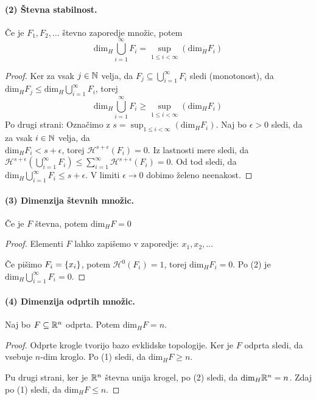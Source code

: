 \paragraph{(2) Števna stabilnost.} Če je \(F_1, F_2, \ldots\) števno zaporedje množic, potem 
\[\text{dim}_H \bigcup_{i=1}^\infty F_i = \sup_{1 \leq i < \infty} (\text{dim}_H F_i)\]
\begin{proof}
    Ker za vsak \(j \in \mathbb{N}\) velja, da \(F_j \subseteq \bigcup_{i=1}^\infty F_i\) sledi (monotonost), da \(\text{dim}_H F_j \leq \text{dim}_H \bigcup_{i=1}^\infty F_i\), torej 
    \[\text{dim}_H \bigcup_{i=1}^\infty F_i \geq \sup_{1 \leq i < \infty} (\text{dim}_H F_i)\]
    Po drugi strani: Označimo z \(s = \sup_{1 \leq i < \infty} (\text{dim}_H F_i)\). Naj bo \(\epsilon > 0\) sledi, da za vsak \(i \in \mathbb{N}\) velja, da \\ \(\text{dim}_H F_i < s + \epsilon\), torej \(\mathcal{H}^{s + \epsilon}(F_i) = 0\). Iz lastnosti mere sledi, da \(\mathcal{H}^{s + \epsilon} \left(\bigcup_{i=1}^\infty F_i\right) \leq \sum_{i=1}^{\infty} \mathcal{H}^{s + \epsilon}(F_i) = 0\). Od tod sledi, da \(\text{dim}_H \bigcup_{i=1}^\infty F_i \leq s + \epsilon\). V limiti \(\epsilon \to 0\) dobimo želeno neenakost. 
\end{proof}

\paragraph{(3) Dimenzija števnih množic.} Če je \(F\) števna, potem \(\text{dim}_H  F = 0\)
\begin{proof}
    Elementi \(F\) lahko zapišemo v zaporedje: \(x_1, x_2, \ldots\) 
    
    Če pišimo \(F_i = \left\{x_i\right\}\), potem \(\mathcal{H}^{0}(F_i) = 1\), torej \(\text{dim}_H F_i = 0\). Po (2) je \(\text{dim}_H \bigcup_{i=1}^\infty F_i = 0\).
\end{proof}

\paragraph{(4) Dimenzija odprtih množic.} Naj bo \(F \subseteq \mathbb{R}^n\) odprta. Potem \(\text{dim}_H F = n\).
\begin{proof}
    Odprte krogle tvorijo bazo evklidske topologije. Ker je \(F\) odprta sledi, da vsebuje \(n\)-dim kroglo. Po (1) sledi, da \(\text{dim}_H F \geq n\). 

    Pu drugi strani, ker je \(\mathbb{R}^n\) števna unija krogel, po (2) sledi, da \(\text{dim}_H \mathbb{R}^n = n\). Zdaj po (1) sledi, da \(\text{dim}_H F \leq n\).
\end{proof}

